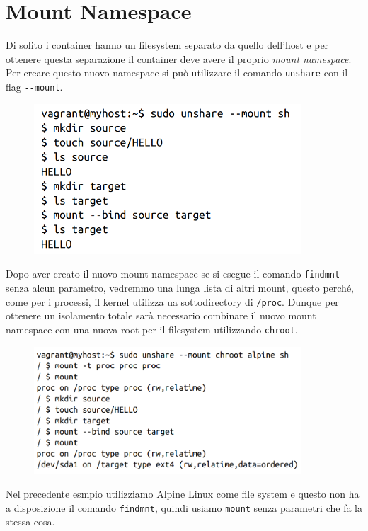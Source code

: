 \section{Mount Namespace}

Di solito i container hanno un filesystem separato da quello dell'host e per
ottenere questa separazione il container deve avere il proprio
\textit{mount namespace}. Per creare questo nuovo namespace si può utilizzare
il comando \verb|unshare| con il flag \verb|--mount|.

\begin{figure}[H]
    \centering
    \includegraphics[width=10cm, keepaspectratio]{capitoli/os_security/imgs/mount1.png}
\end{figure}

Dopo aver creato il nuovo mount namespace se si esegue il comando \verb|findmnt|
senza alcun parametro, vedremmo una lunga lista di altri mount, questo perché,
come per i processi, il kernel utilizza ua sottodirectory di \verb|/proc|.
Dunque per ottenere un isolamento totale sarà necessario combinare il nuovo mount
namespace con una nuova root per il filesystem utilizzando \verb|chroot|.

\begin{figure}[H]
    \centering
    \includegraphics[width=10cm, keepaspectratio]{capitoli/os_security/imgs/mount2.png}
\end{figure}

Nel precedente esmpio utilizziamo Alpine Linux come file system e questo non
ha a disposizione il comando \verb|findmnt|, quindi usiamo \verb|mount| senza
parametri che fa la stessa cosa.\\

